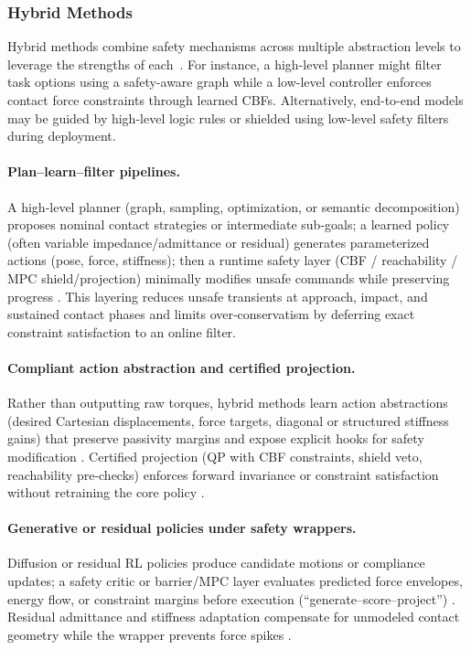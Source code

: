 \documentclass[Afour,sageh,times]{template/sagej}
\begin{document}
\subsubsection{Hybrid Methods}
Hybrid methods combine safety mechanisms across multiple abstraction levels to leverage the strengths of each~\cite{24}. For instance, a high-level planner might filter task options using a safety-aware graph while a low-level controller enforces contact force constraints through learned CBFs. Alternatively, end-to-end models may be guided by high-level logic rules or shielded using low-level safety filters during deployment.

\paragraph{Plan–learn–filter pipelines.} A high‑level planner (graph, sampling, optimization, or semantic decomposition) proposes nominal contact strategies or intermediate sub‑goals; a learned policy (often variable impedance/admittance or residual) generates parameterized actions (pose, force, stiffness); then a runtime safety layer (CBF / reachability / MPC shield/projection) minimally modifies unsafe commands while preserving progress \citep{25,28,29,26,martinez2015safe,yuan2022safe}. This layering reduces unsafe transients at approach, impact, and sustained contact phases and limits over‑conservatism by deferring exact constraint satisfaction to an online filter.

\paragraph{Compliant action abstraction and certified projection.} Rather than outputting raw torques, hybrid methods learn action abstractions (desired Cartesian displacements, force targets, diagonal or structured stiffness gains) that preserve passivity margins and expose explicit hooks for safety modification \citep{zhang2025passivity,zhang2024srl,25,28,317,roveda2020model}. Certified projection (QP with CBF constraints, shield veto, reachability pre‑checks) enforces forward invariance or constraint satisfaction without retraining the core policy \citep{29,26,yuan2022safe,152}.

\paragraph{Generative or residual policies under safety wrappers.} Diffusion or residual RL policies produce candidate motions or compliance updates; a safety critic or barrier/MPC layer evaluates predicted force envelopes, energy flow, or constraint margins before execution (“generate–score–project”) \citep{100,zhang2024srl,29,zhang2025passivity,362,117,12}. Residual admittance and stiffness adaptation compensate for unmodeled contact geometry while the wrapper prevents force spikes \citep{25,28,317,178}.
\end{document}
